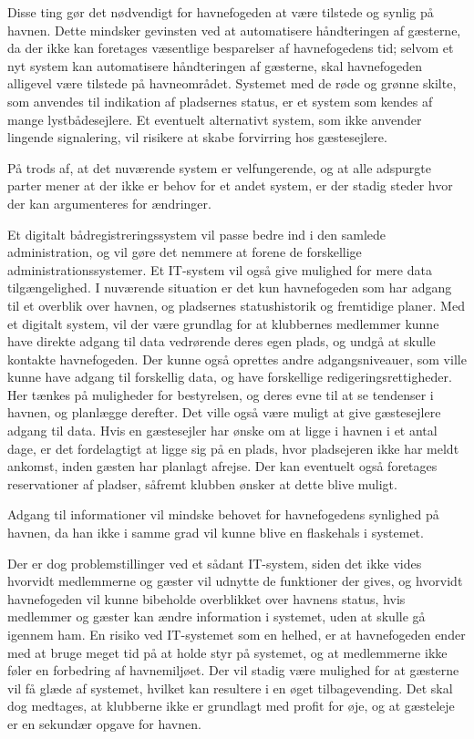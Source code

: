 Disse ting gør det nødvendigt for havnefogeden at være tilstede og synlig på havnen. Dette mindsker gevinsten ved at automatisere håndteringen af gæsterne, da der ikke kan foretages væsentlige besparelser af havnefogedens tid; selvom et nyt system kan automatisere håndteringen af gæsterne, skal havnefogeden alligevel være tilstede på havneområdet. Systemet med de røde og grønne skilte, som anvendes til indikation af pladsernes status, er et system som kendes af mange lystbådesejlere. Et eventuelt alternativt system, som ikke anvender lingende signalering, vil risikere at skabe forvirring hos gæstesejlere.

På trods af, at det nuværende system er velfungerende, og at alle adspurgte parter mener at der ikke er behov for et andet system, er der stadig steder hvor der kan argumenteres for ændringer.

Et digitalt bådregistreringssystem vil passe bedre ind i den samlede administration, og vil gøre det nemmere at forene de forskellige administrationssystemer. Et IT-system vil også give mulighed for mere data tilgængelighed. I nuværende situation er det kun havnefogeden som har adgang til et overblik over havnen, og pladsernes statushistorik og fremtidige planer. Med et digitalt system, vil der være grundlag for at klubbernes medlemmer kunne have direkte adgang til data vedrørende deres egen plads, og undgå at skulle kontakte havnefogeden. Der kunne også oprettes andre adgangsniveauer, som ville kunne have adgang til forskellig data, og have forskellige redigeringsrettigheder. Her tænkes på muligheder for bestyrelsen, og deres evne til at se tendenser i havnen, og planlægge derefter. Det ville også være muligt at give gæstesejlere adgang til data. Hvis en gæstesejler har ønske om at ligge i havnen i et antal dage, er det fordelagtigt at ligge sig på en plads, hvor pladsejeren ikke har meldt ankomst, inden gæsten har planlagt afrejse. Der kan eventuelt også foretages reservationer af pladser, såfremt klubben ønsker at dette blive muligt.

Adgang til informationer vil mindske behovet for havnefogedens synlighed på havnen, da han ikke i samme grad vil kunne blive en flaskehals i systemet.

Der er dog problemstillinger ved et sådant IT-system, siden det ikke vides hvorvidt medlemmerne og gæster vil udnytte de funktioner der gives, og hvorvidt havnefogeden vil kunne bibeholde overblikket over havnens status, hvis medlemmer og gæster kan ændre information i systemet, uden at skulle gå igennem ham. En risiko ved IT-systemet som en helhed, er at havnefogeden ender med at bruge meget tid på at holde styr på systemet, og at medlemmerne ikke føler en forbedring af havnemiljøet. Der vil stadig være mulighed for at gæsterne vil få glæde af systemet, hvilket kan resultere i en øget tilbagevending. Det skal dog medtages, at klubberne ikke er grundlagt med profit for øje, og at gæsteleje er en sekundær opgave for havnen.